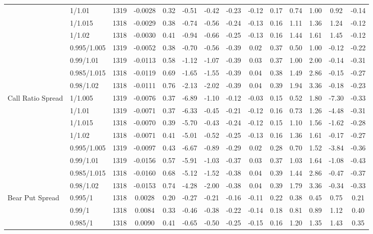 \begin{tabular}{llcccccccccccc}
 & 1/1.01 & 1319 & -0.0028 & 0.32 & -0.51 & -0.42 & -0.23 & -0.12 & 0.17 & 0.74 & 1.00 & 0.92 & -0.14 \\
 & 1/1.015 & 1318 & -0.0029 & 0.38 & -0.74 & -0.56 & -0.24 & -0.13 & 0.16 & 1.11 & 1.36 & 1.24 & -0.12 \\
 & 1/1.02 & 1318 & -0.0030 & 0.41 & -0.94 & -0.66 & -0.25 & -0.13 & 0.16 & 1.44 & 1.61 & 1.45 & -0.12 \\
 & 0.995/1.005 & 1319 & -0.0052 & 0.38 & -0.70 & -0.56 & -0.39 & 0.02 & 0.37 & 0.50 & 1.00 & -0.12 & -0.22 \\
 & 0.99/1.01 & 1319 & -0.0113 & 0.58 & -1.12 & -1.07 & -0.39 & 0.03 & 0.37 & 1.00 & 2.00 & -0.14 & -0.31 \\
 & 0.985/1.015 & 1318 & -0.0119 & 0.69 & -1.65 & -1.55 & -0.39 & 0.04 & 0.38 & 1.49 & 2.86 & -0.15 & -0.27 \\
 & 0.98/1.02 & 1318 & -0.0111 & 0.76 & -2.13 & -2.02 & -0.39 & 0.04 & 0.39 & 1.94 & 3.36 & -0.18 & -0.23 \\
Call Ratio Spread & 1/1.005 & 1319 & -0.0076 & 0.37 & -6.89 & -1.10 & -0.12 & -0.03 & 0.15 & 0.52 & 1.80 & -7.30 & -0.33 \\
 & 1/1.01 & 1319 & -0.0071 & 0.37 & -6.33 & -0.45 & -0.21 & -0.12 & 0.16 & 0.73 & 1.26 & -4.48 & -0.31 \\
 & 1/1.015 & 1318 & -0.0070 & 0.39 & -5.70 & -0.43 & -0.24 & -0.12 & 0.15 & 1.10 & 1.56 & -1.62 & -0.28 \\
 & 1/1.02 & 1318 & -0.0071 & 0.41 & -5.01 & -0.52 & -0.25 & -0.13 & 0.16 & 1.36 & 1.61 & -0.17 & -0.27 \\
 & 0.995/1.005 & 1319 & -0.0097 & 0.43 & -6.67 & -0.89 & -0.29 & 0.02 & 0.28 & 0.70 & 1.52 & -3.84 & -0.36 \\
 & 0.99/1.01 & 1319 & -0.0156 & 0.57 & -5.91 & -1.03 & -0.37 & 0.03 & 0.37 & 1.03 & 1.64 & -1.08 & -0.43 \\
 & 0.985/1.015 & 1318 & -0.0160 & 0.68 & -5.12 & -1.52 & -0.38 & 0.04 & 0.39 & 1.44 & 2.86 & -0.47 & -0.37 \\
 & 0.98/1.02 & 1318 & -0.0153 & 0.74 & -4.28 & -2.00 & -0.38 & 0.04 & 0.39 & 1.79 & 3.36 & -0.34 & -0.33 \\
Bear Put Spread & 0.995/1 & 1318 & 0.0028 & 0.20 & -0.27 & -0.21 & -0.16 & -0.11 & 0.22 & 0.38 & 0.45 & 0.75 & 0.21 \\
 & 0.99/1 & 1318 & 0.0084 & 0.33 & -0.46 & -0.38 & -0.22 & -0.14 & 0.18 & 0.81 & 0.89 & 1.12 & 0.40 \\
 & 0.985/1 & 1318 & 0.0090 & 0.41 & -0.65 & -0.50 & -0.25 & -0.15 & 0.16 & 1.20 & 1.35 & 1.43 & 0.35 \\

\end{tabular}
